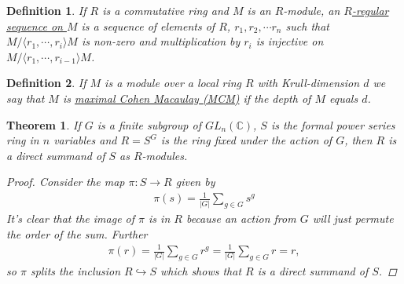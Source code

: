 \documentclass[11pt, a4paper, english]{article}
\numberwithin{prop}{section}
\numberwithin{lemma}{section}
\newtheorem{theorem}{Theorem}
\numberwithin{theorem}{section}
\newtheorem{defin}{Definition}
\numberwithin{defin}{section}
\numberwithin{example}{section}
\newcommand{\C}{\mathbb{C}}
\begin{document}
\begin{defin}
If $R$ is a commutative ring and $M$ is an $R$-module, an \underline{$R$-regular sequence on $M$} is a sequence of elements of $R$, $r_1, r_2, \cdots r_n$ such that $M/\langle r_1, \cdots, r_i \rangle M$ is non-zero and multiplication by $r_i$ is injective on $M/\langle r_1, \cdots, r_{i-1} \rangle M$.
\end{defin}

\begin{defin}
If $M$ is a module over a local ring $R$ with Krull-dimension $d$ we say that $M$ is \underline{maximal Cohen Macaulay (MCM)} if the depth of $M$ equals $d$.
\end{defin}

\begin{theorem}
If $G$ is a finite subgroup of $GL_n(\C)$, $S$ is the formal power series ring in $n$ variables and $R = S^G$ is the ring fixed under the action of $G$, then $R$ is a direct summand of $S$ as $R$-modules.

\begin{proof}
Consider the map $\pi: S \to R$ given by
\begin{align*}
\pi(s) = \frac{1}{|G|} \sum_{g\in G} s^g
\end{align*}
It's clear that the image of $\pi$ is in $R$ because an action from $G$ will just permute the order of the sum. Further \begin{align*}
\pi(r) = \frac{1}{|G|} \sum_{g\in G} r^g = \frac{1}{|G|} \sum_{g\in G} r = r,
\end{align*}
so $\pi$ splits the inclusion $R \hookrightarrow S$ which shows that $R$ is a direct summand of $S$.
\end{proof}
\end{theorem}
\end{document}
